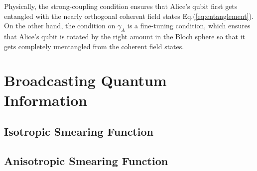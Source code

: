 \documentclass[a4paper,12pt]{article}
\begin{document}
Physically, the strong-coupling condition ensures that Alice's qubit first gets entangled with the nearly orthogonal coherent field states Eq.(\ref{eq:entanglement}).
On the other hand, the condition on $\gamma_A$ is a fine-tuning condition, which ensures that Alice's qubit is rotated by the right amount in the Bloch sphere so that it gets completely unentangled from the coherent field states. 



\section{Broadcasting Quantum Information}

\subsection*{Isotropic Smearing Function}

\subsection*{Anisotropic Smearing Function}

\appendix

\acknowledgments


\end{document}
